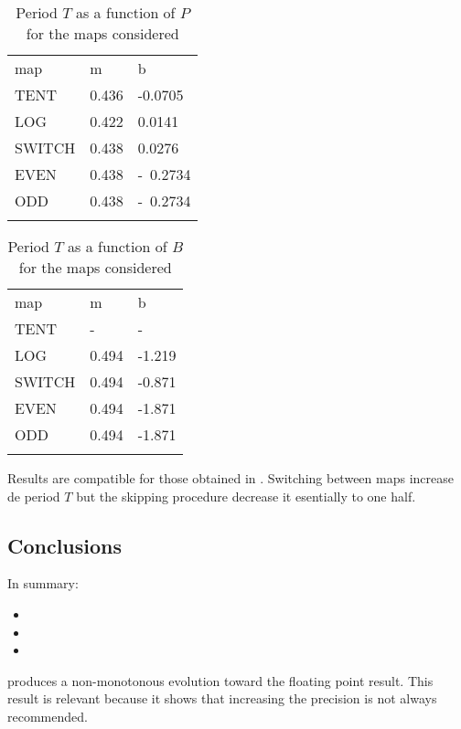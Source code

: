 \begin{table}
\caption{Period $T$ as a function of $P$ for the maps considered}
\label{tabla:tab1}       %
\begin{tabular}{lll}
\hline\noalign{\smallskip}
map & m & b  \\
\noalign{\smallskip}\hline\noalign{\smallskip}
TENT&0.436 & -0.0705 \\
LOG &0.422 & 0.0141 \\
SWITCH &0.438 & 0.0276 \\
EVEN &0.438 & -~0.2734 \\
ODD &0.438 & -~0.2734 \\
\noalign{\smallskip}\hline
\end{tabular}
\end{table}
%
\begin{table}
\caption{Period $T$ as a function of $B$ for the maps considered}
\label{tabla:tab2}       %
\begin{tabular}{lll}
\hline\noalign{\smallskip}
map & m & b  \\
\noalign{\smallskip}\hline\noalign{\smallskip}
TENT&- & - \\
LOG &0.494 & -1.219 \\
SWITCH &0.494 & -0.871 \\
EVEN &0.494 & -1.871 \\
ODD &0.494 & -1.871 \\
\noalign{\smallskip}\hline
\end{tabular}
\end{table}
Results are compatible for those obtained in \cite{Nagaraj2008}. Switching between maps increase de period $T$ but the skipping procedure decrease it esentially to one half. 
% 

\subsection{Conclusions}\label{sec:conclusions}
In summary:
\begin{itemize}
  \item 
  \item 
  \item 
\end{itemize}produces a non-monotonous evolution toward the floating point result. This result is relevant because it shows that increasing the precision is not
always recommended.


